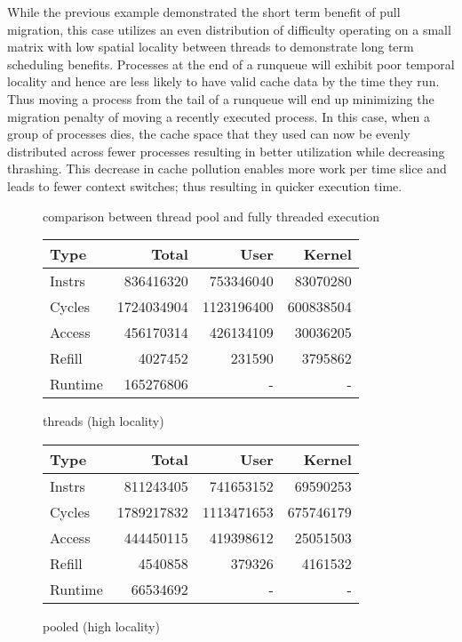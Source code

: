 \documentclass[11pt]{article}
\begin{document}
While the previous example demonstrated the short term benefit of pull migration, this case utilizes an even distribution of difficulty operating on a small matrix with low spatial locality between threads to demonstrate long term scheduling benefits.  Processes at the end of a runqueue will exhibit poor temporal locality and hence are less likely to have valid cache data by the time they run.  Thus moving a process from the tail of a runqueue will end up minimizing the migration penalty of moving a recently executed process.  In this case, when a group of processes dies, the cache space that they used can now be evenly distributed across fewer processes resulting in better utilization while decreasing thrashing.  This decrease in cache pollution enables more work per time slice and leads to fewer context switches; thus resulting in quicker execution time.

\begin{figure*}[!h]
	\caption{comparison between thread pool and fully threaded execution}
	\centering
	\begin{subtable}{.48\textwidth}
		\centering
		\begin{tabular}{ l|rrr }
			Type    & Total      & User       & Kernel    \\
			\hline
			Instrs  & 836416320  & 753346040  & 83070280  \\ 
			Cycles  & 1724034904 & 1123196400 & 600838504 \\ 
			Access  & 456170314  & 426134109  & 30036205  \\ 
			Refill  & 4027452    & 231590     & 3795862   \\ 
			Runtime & 165276806  & -          & -         \\
			\hline
		\end{tabular}
		\caption{threads (high locality)}
	\end{subtable}
	\hfill
	\begin{subtable}{.48\textwidth} 
		\centering
		\begin{tabular}{ l|rrr }
			Type    & Total      & User       & Kernel    \\
			\hline
			Instrs  & 811243405  & 741653152  & 69590253  \\ 
			Cycles  & 1789217832 & 1113471653 & 675746179 \\ 
			Access  & 444450115  & 419398612  & 25051503  \\ 
			Refill  & 4540858    & 379326     & 4161532   \\ 
			Runtime & 66534692   & -          & -         \\
			\hline
		\end{tabular}
		\caption{pooled (high locality)}        
	\end{subtable}
\end{figure*}
\end{document}
